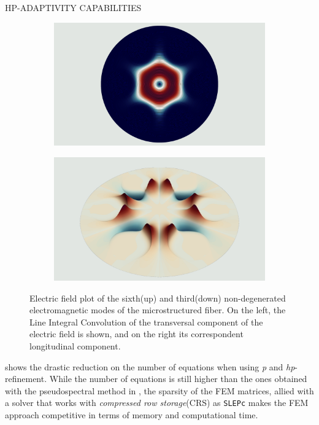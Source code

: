 \documentclass[debug]{beamer} %
\begin{document}
\begin{frame}
\begin{minipage}[t]{0.45\textwidth}
\begin{block}{\boxnumber HP-ADAPTIVITY CAPABILITIES }
\begin{figure}[hb]
\begin{mdframed}[backgroundcolor=bggrey]
					\begin{subfigure}[b]{.4999\textwidth}
						\centering
						\includegraphics[width=1\linewidth]{images/et2posterHoley.png}%
					\end{subfigure}\hfill
					\begin{subfigure}[b]{.4999\textwidth}
						\centering
						\includegraphics[width=1\linewidth]{images/ez2posterHoley.png}%
					\end{subfigure}
				\end{mdframed}
				\caption{Electric field plot of the sixth(up) and third(down) non-degenerated electromagnetic modes of the microstructured fiber. On the left, the Line Integral Convolution of the transversal component of the electric field is shown, and on the right its correspondent longitudinal component.}
				\label{fig:plot-holey}
			\end{figure}

			 shows the drastic reduction on the number of equations when using \emph{p} and \emph{hp}-refinement. While the number of equations is still higher than the ones obtained with the pseudospectral method in \textcite{chiang11}, the sparsity of the FEM matrices, allied with a solver that works with \emph{compressed row storage}(CRS) as \texttt{SLEPc}\parencite{slepc05} makes the FEM approach competitive in terms of memory and computational time.


\end{block}
\end{minipage}
\end{frame}
\end{document}
